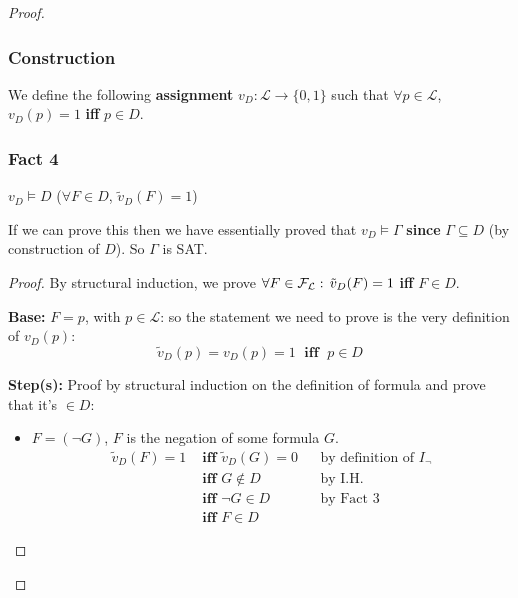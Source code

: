 \begin{proof}
		\subsubsection{Construction}
		We define the following \textbf{assignment} $v_D: \mathcal{L} \rightarrow \{0,1\}$ such that $\forall p \in \mathcal{L}$, $v_D (p) = 1$ \textbf{iff} $p \in D$. 		

		\subsubsection{Fact 4}
		\begin{center}
		$v_D \models D$ \quad ($\forall F \in D$, $\tilde{v}_D (F) = 1$)
		\end{center}
		If we can prove this then we have essentially proved that $v_D \models \Gamma$ \textbf{since} $\Gamma \subseteq D$ (by construction of $D$). So $\Gamma$ is SAT.
		\begin{proof}
			By structural induction, we prove $\forall F \in \mathcal{F}_\mathcal{L}: \, \tilde{v}_D (F) = 1$ \textbf{iff} $F \in D$. 

			\textbf{Base:} $F = p$, with $p \in \mathcal{L}$: so the statement we need to prove is the very definition of $v_D (p)$:
			$$\tilde{v}_D (p) = v_D (p) = 1 \; \textbf{ iff } \; p \in D $$

			\textbf{Step(s):} Proof by structural induction on the definition of formula and prove that it's $\in D$:
			\begin{itemize}
				\item $F = (\neg G)$, $F$ is the negation of some formula $G$.
				\begin{align*}
				  \tilde{v}_D (F) = 1 &\textbf{ iff } \tilde{v}_D (G) = 0 && \text{by definition of $I_\neg$} \\
				  &\textbf{ iff } G \notin D && \text{by I.H.} \\
				  &\textbf{ iff } \neg G \in D && \text{by Fact 3} \\
				  &\textbf{ iff } F \in D &&
				\end{align*}


\end{itemize}
\end{proof}
\end{proof}
